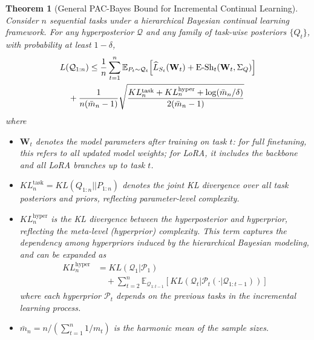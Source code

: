 \documentclass[letterpaper]{article} %
\newtheorem{theorem}{Theorem}
\begin{document}


\begin{theorem}[General PAC-Bayes Bound for Incremental Continual Learning]
\label{thm:general-pacbayes}
Consider $n$ sequential tasks under a hierarchical Bayesian continual learning framework. For any hyperposterior $\mathcal{Q}$ and any family of task-wise posteriors $\{Q_t\}$, with probability at least $1-\delta$,
\begin{align}
& L(\mathcal{Q}_{1:n}) \leq \frac{1}{n} \sum_{t=1}^n \mathbb{E}_{P_{t} \sim \mathcal{Q}_{t}} \Big[ \widehat{L}_{S_t}(\mathbf{W}_t) 
+ {\mathrm{E\text{-}Sh}}_t(\mathbf{W}_t, \Sigma_Q) \Big] \notag\\
& \quad  +\frac{1}{n(\bar{m}_n-1)} \sqrt{
\frac{
KL^{\text{task}}_n + KL^{\text{hyper}}_n + \log(\bar{m}_n/\delta)
}{2(\bar{m}_n-1)}
}
\end{align}
where
\begin{itemize}
\item $\mathbf{W}_t$ denotes the model parameters after training on task $t$: for full finetuning, this refers to all updated model weights; for LoRA, it includes the backbone and all LoRA branches up to task $t$.
\item $KL^{\text{task}}_n = KL(Q_{1:n}||P_{1:n})$ denotes the joint KL divergence over all task posteriors and priors, reflecting parameter-level complexity.
\item $KL^{\text{hyper}}_n$ is the KL divergence between the hyperposterior and hyperprior, reflecting the meta-level (hyperprior) complexity. This term captures the dependency among hyperpriors induced by the hierarchical Bayesian modeling, and can be expanded as
$$
\begin{aligned}
    KL^{\text{hyper}}_n&=KL(\mathcal{Q}_1 |\mathcal{P}_1)  \\
    & \quad + \sum_{t=2}^n  \mathbb{E}_{\mathcal{Q}_{1:t-1}} [ KL(\mathcal{Q}_t | \mathcal{P}_t(\cdot|\mathcal{Q}_{1:t-1})) ]
\end{aligned}
$$ 
where each hyperprior $\mathcal{P}_t$ depends on the previous tasks in the incremental learning process.
\item $\bar{m}_n = n / (\sum_{t=1}^n 1/m_t)$ is the harmonic mean of the sample sizes.
\end{itemize}
\end{theorem}

\end{document}
